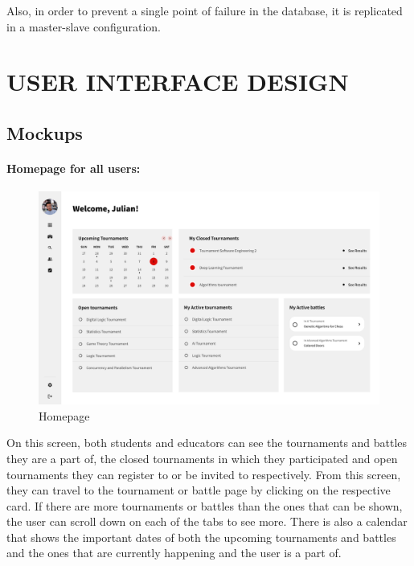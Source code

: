 \documentclass{article}
\begin{document}
Also, in order to prevent a single point of failure in the database, it is replicated in a master-slave configuration.

\section{USER INTERFACE DESIGN}

\subsection{Mockups}

\paragraph{Homepage for all users:}

\begin{figure}[H]
    \centering
    \includegraphics[width=1\textwidth]{images/UI/Homepage.png}
    \caption{Homepage}
    \label{fig:Homepage}
\end{figure}

On this screen, both students and educators can see the tournaments and battles 
they are a part of, the closed tournaments in which they participated and open 
tournaments they can register to or be invited to respectively. From this screen, they
can travel to the tournament or battle page by clicking on the respective card. If there
are more tournaments or battles than the ones that can be shown, the user can scroll down
on each of the tabs to see more. There is also a calendar that shows the important dates
of both the upcoming tournaments and battles and the ones that are currently happening and
the user is a part of.
\end{document}
